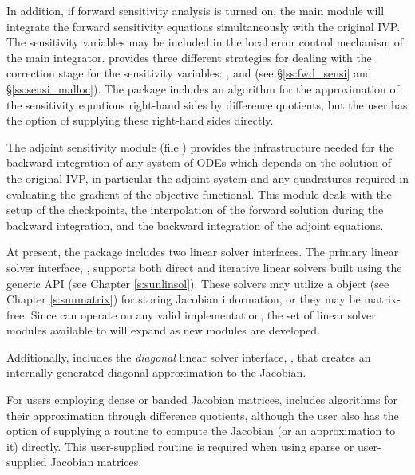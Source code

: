 In addition, if forward sensitivity analysis is turned on, the main module 
will integrate the forward sensitivity equations simultaneously with the original
IVP. The sensitivity variables may be included in the local error control
mechanism of the main integrator.
{\cvodes} provides three different strategies for dealing with the correction
stage for the sensitivity variables: ,  and
 (see \S\ref{ss:fwd_sensi} and \S\ref{ss:sensi_malloc}).
The {\cvodes} package includes an algorithm for the approximation of the
sensitivity equations right-hand sides by difference quotients, but the user has
the option of supplying these right-hand sides directly.

The adjoint sensitivity module (file ) provides the infrastructure needed for the 
backward integration of any system of ODEs which depends on the solution 
of the original IVP, in particular the adjoint system and any quadratures required
in evaluating the gradient of the objective functional.  This module deals with
the setup of the checkpoints, the interpolation of the forward solution during
the backward integration, and the backward integration of the adjoint equations.

At present, the package includes two linear solver interfaces.  The
primary linear solver interface, {\cvls}, supports both direct and
iterative linear solvers built using the generic {\sunlinsol} API (see
Chapter \ref{s:sunlinsol}).  These solvers may utilize a {\sunmatrix}
object (see Chapter \ref{s:sunmatrix}) for storing Jacobian
information, or they may be matrix-free. Since {\cvodes} can operate on
any valid {\sunlinsol} implementation, the set of linear solver
modules available to {\cvodes} will expand as new {\sunlinsol} modules
are developed.

Additionally, {\cvodes} includes the {\em diagonal} linear solver
interface, {\cvdiag}, that creates an internally generated diagonal
approximation to the Jacobian.

For users employing dense or banded Jacobian matrices, {\cvodes}
includes algorithms for their approximation through difference 
quotients, although the user also has the option of supplying a
routine to compute the Jacobian (or an approximation to it) directly.
This user-supplied routine is required when using sparse or
user-supplied Jacobian matrices.

